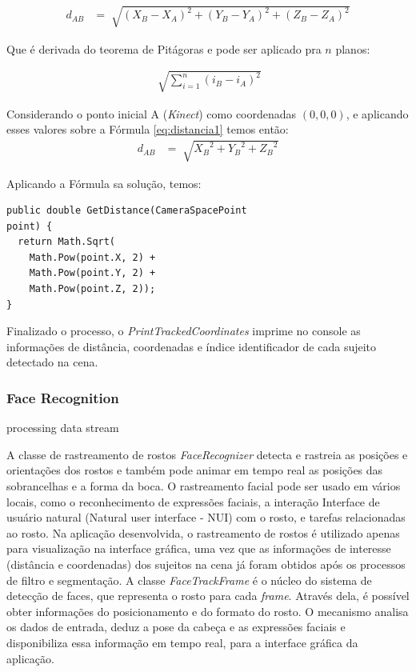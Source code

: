 \begin{align}
    d_{AB} &= \sqrt[]{{(X_{B} - X_{A})}^2 + {(Y_{B} - Y_{A})}^2 + {(Z_{B} - Z_{A})}^2}
    \label{eq:distancia1}
\end{align}

Que é derivada do teorema de Pitágoras e pode ser aplicado pra $n$ planos:

\begin{align}
    \sqrt[]{\sum_{i=1}^{n}{(i_{B} - i_{A})}^2}
    \label{eq:pitagoras}
\end{align}


Considerando o ponto inicial A (\textit{Kinect}) como coordenadas $(0,0,0)$, e aplicando esses valores sobre a Fórmula   \ref{eq:distancia1} temos então:
\begin{align}
    d_{AB} &= \sqrt[]{{X_{B}}^2 + {Y_{B}}^2 + {Z_{B}}^2} 
    \label{eq:distanciaFinal}
\end{align}


Aplicando a Fórmula sa solução, temos:
\begin{verbatim}
public double GetDistance(CameraSpacePoint
point) {
  return Math.Sqrt(
	Math.Pow(point.X, 2) +
	Math.Pow(point.Y, 2) +
	Math.Pow(point.Z, 2));
}
\end{verbatim}

Finalizado o processo, o \textit{PrintTrackedCoordinates} imprime no console as informações de distância, coordenadas e índice identificador de cada sujeito detectado na cena.

\subsubsection{Face Recognition}\label{sec:depthDataRecognition}
processing data stream


A classe de rastreamento de rostos \textit{FaceRecognizer} detecta e rastreia as posições e orientações dos rostos e também pode animar em tempo real as posições das sobrancelhas e a forma da boca. O rastreamento facial pode ser usado em vários locais, como o reconhecimento de expressões faciais, a interação Interface de usuário natural (Natural user interface - NUI) com o rosto, e tarefas relacionadas ao rosto. Na aplicação desenvolvida, o rastreamento de rostos é utilizado apenas para visualização na interface gráfica, uma vez que as informações de interesse (distância e coordenadas) dos sujeitos na cena já foram obtidos após os processos de filtro e segmentação. A classe \textit{FaceTrackFrame} é o núcleo do sistema de detecção de faces, que representa o rosto para cada \textit{frame}. Através dela, é possível obter informações do posicionamento e do formato do rosto. O mecanismo analisa os dados de entrada, deduz a pose da cabeça e as expressões faciais e disponibiliza essa informação em tempo real, para a interface gráfica da aplicação.

